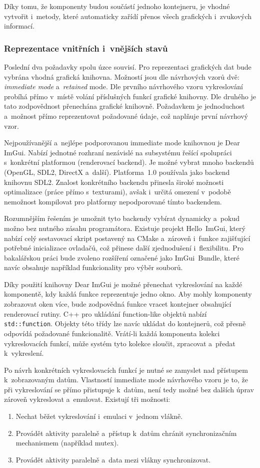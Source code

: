 Díky tomu, že komponenty budou součástí jednoho kontejneru, je vhodné vytvořit i~metody, které automaticky zařídí přenos všech grafických i~zvukových informací.

\subsubsection{Reprezentace vnitřních i~vnějších stavů}
Poslední dva požadavky spolu úzce souvisí. Pro reprezentaci grafických dat bude vybrána vhodná grafická knihovna. Možností jsou dle návrhových vzorů dvě: \emph{immediate mode} a~\emph{retained} mode. Dle prvního návrhového vzoru vykreslování probíhá přímo v~místě volání příslušných funkcí grafické knihovny. Dle druhého je tato zodpovědnost přenechána grafické knihovně. Požadavkem je jednoduchost a~možnost přímo reprezentovat požadované údaje, což naplňuje první návrhový vzor.

Nejpoužívanější a~nejlépe podporovanou immediate mode knihovnou je Dear ImGui.  Nabízí jednotné rozhraní nezávislé na subsystému řešící spolupráci s~konkrétní platformou (renderovací backend). Je možné vybrat mnoho backendů (OpenGL, SDL2, DirectX a~další). Platforma~1.0 používala jako backend knihovnu SDL2. Znalost konkrétního backendu přinesla široké možnosti optimalizace (práce přímo s~texturami), avšak i~určitá omezení v~podobě nemožnost kompilovat pro platformy nepodporované tímto backendem.

Rozumnějším řešením je umožnit tyto backendy vybírat dynamicky a~pokud možno bez nutného zásahu programátora. Existuje projekt Hello~ImGui, který nabízí celý sestavovací skript postavený na CMake a~zároveň i~funkce zajišťující potřebné inicializace ovladačů, což přinese další zjednodušení i~flexibilitu. Pro bakalářskou práci bude zvoleno rozšíření označené jako ImGui~Bundle, které navíc obsahuje například funkcionality pro výběr souborů.

Díky použití knihovny Dear ImGui je možné přenechat vykreslování na každé komponentě, kdy každá funkce reprezentuje jedno okno. Aby mohly komponenty zobrazovat oken více, bude zodpovědná funkce vracet kontejner obsahující renderovací rutiny. C++ pro ukládání function-like objektů nabízí \texttt{std::function}. Objekty této třídy lze navíc ukládat do kontejnerů, což přesně odpovídá požadované funkcionalitě. Vrátí-li každá komponenta kolekci vykreslovacích funkcí, může systém tyto kolekce sloučit, zpracovat a~předat k~vykreslení.

Po návrh konkrétních vykreslovacích funkcí je nutné se zamyslet nad přístupem k~zobrazovaným datům. Vlastností immediate mode návrhového vzoru je to, že při vykreslování se přímo přistupuje k~datům, není tedy možné bez dalších úprav zároveň vykreslovat a~emulovat. Existují tři možnosti:
\begin{enumerate}
	\item Nechat běžet vykreslování i~emulaci v~jednom vlákně.
	\item Provádět aktivity paralelně a~přístup k~datům chránit synchronizačním mechanismem (například mutex).
	\item Provádět aktivity paralelně a~data mezi vlákny synchronizovat.
\end{enumerate}

